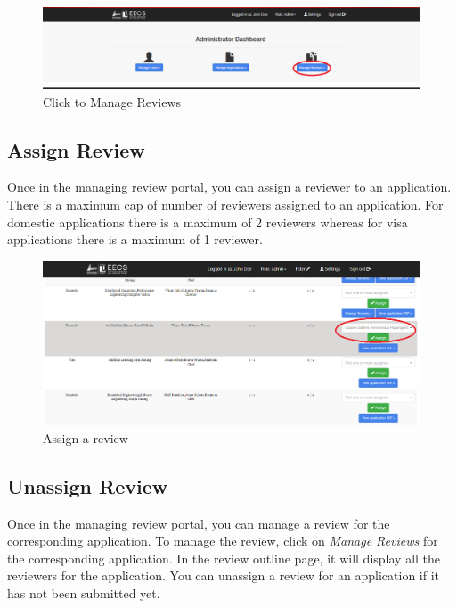 \documentclass[fontsize=12pt,paper=letter,twoside]{scrartcl}
\begin{document}
\begin{figure}[!htb]
\begin{center}
\includegraphics[width=.99\textwidth]{images/mr/manage_review.png}
\end{center}
\caption{Click to Manage Reviews}
\label{fig:manage_review}
\end{figure}


\subsection{Assign Review}
Once in the managing review portal, you can assign a reviewer to an application. There is a maximum cap of number of reviewers assigned to an application. For domestic applications there is a maximum of 2 reviewers whereas for visa applications there is a maximum of 1 reviewer.

\begin{figure}[!htb]
\begin{center}
\includegraphics[width=.99\textwidth]{images/mr/assign_review.png}
\end{center}
\caption{Assign a review}
\label{fig:assign_review}
\end{figure}

\subsection{Unassign Review}
Once in the managing review portal, you can manage a review for the corresponding application. To manage the review, click on \emph{Manage Reviews} for the corresponding application. In the review outline page, it will display all the reviewers for the application. You can unassign a review for an application if it has not been submitted yet.
\end{document}
